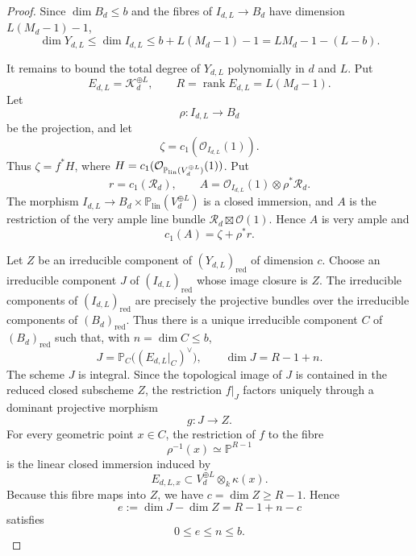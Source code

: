 \documentclass{lms}
\newcommand{\PP}{\mathbb P}
\newcommand{\OO}{\mathcal O}
\begin{document}
\begin{proof}
Since $\dim B_d\le b$ and the fibres of $I_{d,L}\to B_d$ have dimension $L(M_d-1)-1$,
\[
        \dim Y_{d,L}
        \le
        \dim I_{d,L}
        \le
        b+L(M_d-1)-1
        =LM_d-1-(L-b).
\]

It remains to bound the total degree of $Y_{d,L}$ polynomially in $d$ and $L$.  Put
\[
        E_{d,L}=\mathcal K_d^{\oplus L},
        \qquad
        R=\operatorname{rank}E_{d,L}=L(M_d-1).
\]
Let
\[
        \rho:I_{d,L}\to B_d
\]
be the projection, and let
\[
        \zeta=c_1(\OO_{I_{d,L}}(1)).
\]
Thus $\zeta=f^*H$, where $H=c_1(\OO_{\PP_{\rm lin}(V_d^{\oplus L})}(1))$.  Put
\[
        r=c_1(\mathcal R_d),
        \qquad
        A=\OO_{I_{d,L}}(1)\otimes \rho^*\mathcal R_d.
\]
The morphism $I_{d,L}\to B_d\times\PP_{\mathrm{lin}}(V_d^{\oplus L})$ is a closed immersion, and $A$ is the restriction of the very ample line bundle $\mathcal R_d\boxtimes\OO(1)$.  Hence $A$ is very ample and
\[
        c_1(A)=\zeta+\rho^*r.
\]

Let $Z$ be an irreducible component of $(Y_{d,L})_{\mathrm{red}}$ of dimension $c$.  Choose an irreducible component $J$ of $(I_{d,L})_{\mathrm{red}}$ whose image closure is $Z$.  The irreducible components of $(I_{d,L})_{\mathrm{red}}$ are precisely the projective bundles over the irreducible components of $(B_d)_{\mathrm{red}}$.  Thus there is a unique irreducible component $C$ of $(B_d)_{\mathrm{red}}$ such that, with $n=\dim C\le b$,
\[
        J=\PP_C\bigl((E_{d,L}|_C)^\vee\bigr),
        \qquad
        \dim J=R-1+n.
\]
The scheme $J$ is integral.  Since the topological image of $J$ is contained in the reduced closed subscheme $Z$, the restriction $f|_J$ factors uniquely through a dominant projective morphism
\[
        g:J\longrightarrow Z.
\]
For every geometric point $x\in C$, the restriction of $f$ to the fibre
\[
        \rho^{-1}(x)\simeq \PP^{R-1}
\]
is the linear closed immersion induced by
\[
        E_{d,L,x}\subset V_d^{\oplus L}\otimes_k\kappa(x).
\]
Because this fibre maps into $Z$, we have $c=\dim Z\ge R-1$.  Hence
\[
        e:=\dim J-\dim Z=R-1+n-c
\]
satisfies
\[
        0\le e\le n\le b.
\]


\end{proof}
\end{document}
